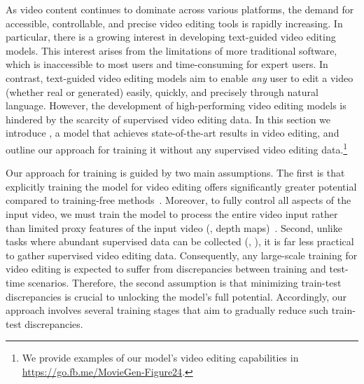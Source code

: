 \newcommand{\highlight}[1]{\textbf{#1}}
As video content continues to dominate across various platforms, the demand for accessible, controllable, and precise video editing tools is rapidly increasing.
In particular, there is a growing interest in developing text-guided video editing models.
This interest arises from the limitations of more traditional software, which is inaccessible to most users and time-consuming for expert users.
In contrast, text-guided video editing models aim to enable \textit{any} user to edit a video (whether real or generated) easily, quickly, and precisely through natural language.
However, the development of high-performing video editing models is hindered by the scarcity of supervised video editing data.
In this section we introduce \OursVideoEdit, a model that achieves state-of-the-art results in video editing, and outline our approach for training it without any supervised video editing data.\footnote{We provide examples of our model's video editing capabilities in \url{https://go.fb.me/MovieGen-Figure24}.}

Our approach for training \OursVideoEdit is guided by two main assumptions.
The first is that explicitly training the model for video editing offers significantly greater potential compared to training-free methods~\citep{meng2021sdedit,Geyer2023TokenFlowCD}.
Moreover, to fully control all aspects of the input video, we must train the model to process the entire video input rather than limited proxy features of the input video (\eg, depth maps)~\citep{esser2023structure,Liang2023FlowVidTI,Yan2023MotionConditionedIA}.
Second, unlike tasks where abundant supervised data can be collected (\eg, \textToV), it is far less practical to gather supervised video editing data.
Consequently, any large-scale training for video editing is expected to suffer from discrepancies between training and test-time scenarios.
Therefore, the second assumption is that minimizing train-test discrepancies is crucial to unlocking the model’s full potential.
Accordingly, our approach involves several training stages that aim to gradually reduce such train-test discrepancies.

